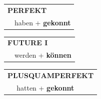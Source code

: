 \documentclass[10pt,a4paper]{revtex4-2}
\begin{document}
\begin{verbbox-modal}
    \vspace{10pt}
 
    \begin{tabular}{rl}
     \multicolumn{2}{l}{\textbf{PERFEKT}}\\
   & haben + \textbf{gekonnt}\\
  \end{tabular}
\hfill
   \begin{tabular}{rl}
   
    \multicolumn{2}{l}{\textbf{FUTURE I} }\\
 &   werden + \textbf{können}\\
 
  \end{tabular}
\hfill
   \begin{tabular}{rl}
      \multicolumn{2}{l}{\textbf{PLUSQUAMPERFEKT}}\\
  &  hatten + \textbf{gekonnt}\\
  \end{tabular}
  
  \vspace{-5pt}

\end{verbbox-modal}
\end{document}
